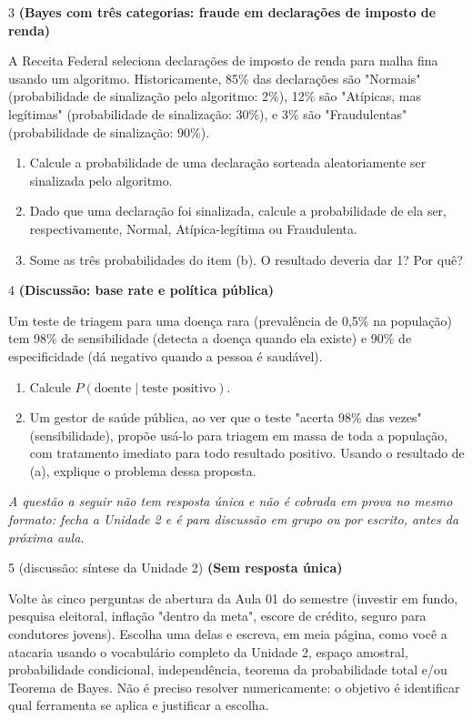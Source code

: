 \documentclass[11pt]{article}
\begin{document}
\begin{questao}{3} \textbf{(Bayes com três categorias: fraude em declarações de imposto de renda)}

A Receita Federal seleciona declarações de imposto de renda para malha fina usando um algoritmo.
Historicamente, 85\% das declarações são "Normais" (probabilidade de sinalização pelo algoritmo:
2\%), 12\% são "Atípicas, mas legítimas" (probabilidade de sinalização: 30\%), e 3\% são
"Fraudulentas" (probabilidade de sinalização: 90\%).

\begin{enumerate}[label=(\alph*)]
  \item Calcule a probabilidade de uma declaração sorteada aleatoriamente ser sinalizada pelo
    algoritmo.
  \item Dado que uma declaração foi sinalizada, calcule a probabilidade de ela ser, respectivamente,
    Normal, Atípica-legítima ou Fraudulenta.
  \item Some as três probabilidades do item (b). O resultado deveria dar 1? Por quê?
\end{enumerate}
\end{questao}

\begin{questao}{4} \textbf{(Discussão: base rate e política pública)}

Um teste de triagem para uma doença rara (prevalência de 0,5\% na população) tem 98\% de
sensibilidade (detecta a doença quando ela existe) e 90\% de especificidade (dá negativo quando a
pessoa é saudável).

\begin{enumerate}[label=(\alph*)]
  \item Calcule $P(\text{doente}\mid\text{teste positivo})$.
  \item Um gestor de saúde pública, ao ver que o teste "acerta 98\% das vezes" (sensibilidade),
    propõe usá-lo para triagem em massa de toda a população, com tratamento imediato para todo
    resultado positivo. Usando o resultado de (a), explique o problema dessa proposta.
\end{enumerate}
\end{questao}

\bigskip
\noindent\textit{A questão a seguir não tem resposta única e não é cobrada em prova no mesmo
formato: fecha a Unidade 2 e é para discussão em grupo ou por escrito, antes da próxima aula.}

\begin{questao}{5 (discussão: síntese da Unidade 2)} \textbf{(Sem resposta única)}

Volte às cinco perguntas de abertura da Aula 01 do semestre (investir em fundo, pesquisa eleitoral,
inflação "dentro da meta", escore de crédito, seguro para condutores jovens). Escolha uma delas e
escreva, em meia página, como você a atacaria usando o vocabulário completo da Unidade 2,
espaço amostral, probabilidade condicional, independência, teorema da probabilidade total e/ou
Teorema de Bayes. Não é preciso resolver numericamente: o objetivo é identificar qual ferramenta se
aplica e justificar a escolha.
\end{questao}
\end{document}
